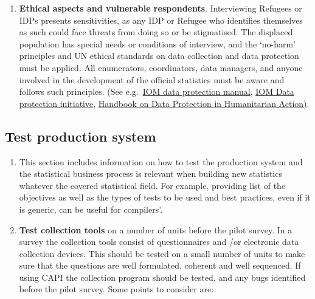 \documentclass[
]{article}
\providecommand{\tightlist}{%
  \setlength{\itemsep}{0pt}\setlength{\parskip}{0pt}}
\begin{document}
\begin{enumerate}
\def\labelenumi{\arabic{enumi}.}
\setcounter{enumi}{310}
\tightlist
\item
  \textbf{Ethical aspects and vulnerable respondents}. Interviewing
  Refugees or IDPs presents sensitivities, as any IDP or Refugee who
  identifies themselves as such could face threats from doing so or be
  stigmatised. The displaced population has special needs or
  conditions of interview, and the `no-harm' principles and UN ethical
  standards on data collection and data protection must be applied.
  All enumerators, coordinators, data managers, and anyone involved in
  the development of the official statistics must be aware and follows
  such principles. (See e.g.~\href{https://publications.iom.int/books/iom-data-protection-manual}{IOM data protection
  manual},
  \href{https://www.iom.int/press-room}{IOM Data protection initiative},
  \href{https://www.icrc.org/en/publication/handbook-data-protection-humanitarian-action}{Handbook on Data Protection in Humanitarian
  Action)}.
\end{enumerate}

\hypertarget{test-production-system-1}{%
\subsection{Test production system}\label{test-production-system-1}}

\begin{enumerate}
\def\labelenumi{\arabic{enumi}.}
\setcounter{enumi}{311}
\item
  This section includes information on how to test the production
  system and the statistical business process is relevant when
  building new statistics whatever the covered statistical field. For
  example, providing list of the objectives as well as the types of
  tests to be used and best practices, even if it is generic, can be
  useful for compilers'.
\item
  \textbf{Test collection tools} on a number of units before the pilot
  survey. In a survey the collection tools consist of questionnaires
  and /or electronic data collection devices. This should be tested on
  a small number of units to make sure that the questions are well
  formulated, coherent and well sequenced. If using CAPI the
  collection program should be tested, and any bugs identified before
  the pilot survey. Some points to consider are:
\end{enumerate}
\end{document}
